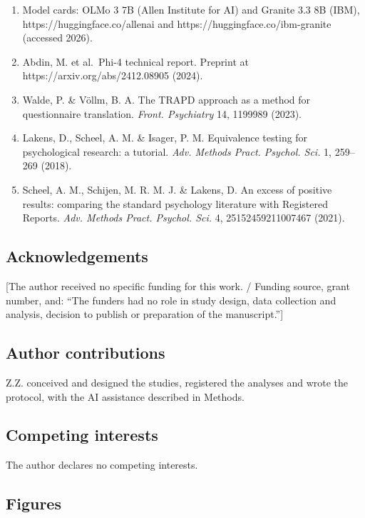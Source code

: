 \documentclass[
  11pt,
]{article}
\begin{document}
\begin{enumerate}
  https://arxiv.org/abs/2505.09388 (2025).
\item
  Model cards: OLMo 3 7B (Allen Institute for AI) and Granite 3.3 8B
  (IBM), https://huggingface.co/allenai and
  https://huggingface.co/ibm-granite (accessed 2026).
\item
  Abdin, M. et al.~Phi-4 technical report. Preprint at
  https://arxiv.org/abs/2412.08905 (2024).
\item
  Walde, P. \& Völlm, B. A. The TRAPD approach as a method for
  questionnaire translation. \emph{Front. Psychiatry} 14, 1199989
  (2023).
\item
  Lakens, D., Scheel, A. M. \& Isager, P. M. Equivalence testing for
  psychological research: a tutorial. \emph{Adv. Methods Pract. Psychol.
  Sci.} 1, 259--269 (2018).
\item
  Scheel, A. M., Schijen, M. R. M. J. \& Lakens, D. An excess of
  positive results: comparing the standard psychology literature with
  Registered Reports. \emph{Adv. Methods Pract. Psychol. Sci.} 4,
  25152459211007467 (2021).
\end{enumerate}

\hypertarget{acknowledgements}{%
\subsection{Acknowledgements}\label{acknowledgements}}

{[}The author received no specific funding for this work. / Funding
source, grant number, and: ``The funders had no role in study design,
data collection and analysis, decision to publish or preparation of the
manuscript.''{]}

\hypertarget{author-contributions}{%
\subsection{Author contributions}\label{author-contributions}}

Z.Z. conceived and designed the studies, registered the analyses and
wrote the protocol, with the AI assistance described in Methods.

\hypertarget{competing-interests}{%
\subsection{Competing interests}\label{competing-interests}}

The author declares no competing interests.

\hypertarget{figures}{%
\subsection{Figures}\label{figures}}
\end{document}
